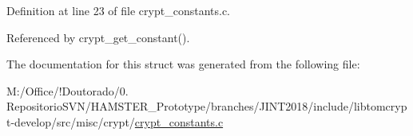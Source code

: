 Definition at line 23 of file crypt\+\_\+constants.\+c.



Referenced by crypt\+\_\+get\+\_\+constant().



The documentation for this struct was generated from the following file\+:\begin{DoxyCompactItemize}
\item 
M\+:/\+Office/!\+Doutorado/0. Repositorio\+S\+V\+N/\+H\+A\+M\+S\+T\+E\+R\+\_\+\+Prototype/branches/\+J\+I\+N\+T2018/include/libtomcrypt-\/develop/src/misc/crypt/\mbox{\hyperlink{crypt__constants_8c}{crypt\+\_\+constants.\+c}}\end{DoxyCompactItemize}
